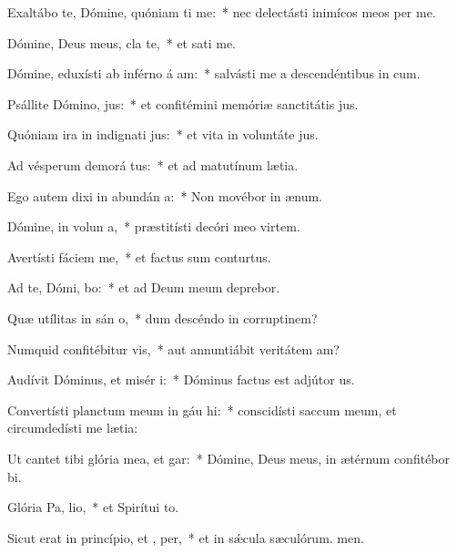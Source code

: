 \item Exaltábo te, Dómine, quóniam ti me:~* nec delectásti inimícos meos per me.
\item Dómine, Deus meus, cla  te,~* et sati me.
\item Dómine, eduxísti ab inférno á am:~* salvásti me a descendéntibus in cum.
\item Psállite Dómino,  jus:~* et confitémini memóriæ sanctitátis jus.
\item Quóniam ira in indignati jus:~* et vita in voluntáte jus.
\item Ad vésperum demorá tus:~* et ad matutínum lætia.
\item Ego autem dixi in abundán a:~* Non movébor in ænum.
\item Dómine, in volun a,~* præstitísti decóri meo virtem.
\item Avertísti fáciem   me,~* et factus sum conturtus.
\item Ad te, Dómi, bo:~* et ad Deum meum deprebor.
\item Quæ utílitas in sán o,~* dum descéndo in corruptinem?
\item Numquid confitébitur  vis,~* aut annuntiábit veritátem am?
\item Audívit Dóminus, et misér  i:~* Dóminus factus est adjútor us.
\item Convertísti planctum meum in gáu hi:~* conscidísti saccum meum, et circumdedísti me lætia:
\item Ut cantet tibi glória mea, et  gar:~* Dómine, Deus meus, in ætérnum confitébor bi.
\item Glória Pa,  lio,~* et Spirítui to.
\item Sicut erat in princípio, et ,  per,~* et in sǽcula sæculórum. men.
